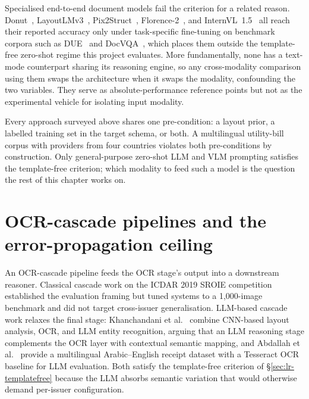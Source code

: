 Specialised end-to-end document models fail the criterion for a
related reason. Donut~\cite{kim2022donut},
LayoutLMv3~\cite{huang2022layoutlmv3},
Pix2Struct~\cite{lee2023pix2struct},
Florence-2~\cite{xiao2024florence}, and
InternVL~1.5~\cite{chen2024internvl} all reach their reported accuracy
only under task-specific fine-tuning on benchmark corpora such as
DUE~\cite{borchmann2021due} and
DocVQA~\cite{mathew2021docvqachallenge}, which places them outside
the template-free zero-shot regime this project evaluates. More
fundamentally, none has a text-mode counterpart sharing its reasoning
engine, so any cross-modality comparison using them swaps the
architecture when it swaps the modality, confounding the two
variables. They serve as absolute-performance reference points but
not as the experimental vehicle for isolating input modality.

Every approach surveyed above shares one pre-condition: a layout
prior, a labelled training set in the target schema, or both. A
multilingual utility-bill corpus with providers from four countries
violates both pre-conditions by construction. Only general-purpose
zero-shot LLM and VLM prompting satisfies the template-free
criterion; which modality to feed such a model is the question the
rest of this chapter works on.

\section{OCR-cascade pipelines and the error-propagation ceiling}
\label{sec:lr-ocrcascade}

An OCR-cascade pipeline feeds the OCR stage's output into a downstream
reasoner. Classical cascade work on the ICDAR 2019 SROIE
competition~\cite{huang2021sroie} established the evaluation framing
but tuned systems to a 1{,}000-image benchmark and did not target
cross-issuer generalisation. LLM-based cascade work relaxes the final
stage: Khanchandani et al.~\cite{khanchandani2026invoice} combine
CNN-based layout analysis, OCR, and LLM entity recognition, arguing
that an LLM reasoning stage complements the OCR layer with
contextual semantic mapping, and Abdallah et
al.~\cite{abdallah2024receiptsense} provide a
multilingual Arabic--English receipt dataset with a Tesseract OCR
baseline for LLM evaluation. Both satisfy the template-free criterion
of \S\ref{sec:lr-templatefree} because the LLM absorbs semantic
variation that would otherwise demand per-issuer configuration.

